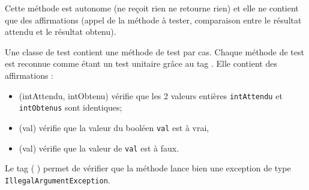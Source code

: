 \documentclass[11pt,a4paper]{article}
\begin{document}
            \par
            
								Cette m\'ethode est autonome (ne re\c coit rien ne retourne rien) 
								et elle ne contient que des affirmations 
								(appel de la m\'ethode \`a tester, comparaison entre le r\'esultat attendu et le r\'esultat obtenu).
							
            \par
            
								Une classe de test contient une m\'ethode de test par cas.
								Chaque m\'ethode de test est reconnue comme \'etant un test unitaire gr\^ace au tag  \textcolor{gray}{\underline{\hspace*{3em}}}  .
								Elle contient des affirmations :
							
            \par
        
					\begin{itemize}
				
			\item  \textcolor{gray}{\underline{\hspace*{10em}}} (intAttendu, intObtenu) 
								  v\'erifie que les 2 valeurs enti\`eres \verb|intAttendu| et \verb|intObtenus| sont identiques;
								
            \par
        
			\item  \textcolor{gray}{\underline{\hspace*{10em}}} (val) 
								  v\'erifie que la valeur du bool\'een \verb|val| est \`a vrai,     
                
            \par
        
			\item  \textcolor{gray}{\underline{\hspace*{10em}}} (val) 
								  v\'erifie que la valeur de \verb|val| est \`a faux.    
                
            \par
        
					\end{itemize}
				    
								Le tag  \textcolor{gray}{\underline{\hspace*{3em}}}  ( \textcolor{gray}{\underline{\hspace*{20em}}} )  
                permet de v\'erifier que la m\'ethode lance bien une exception de type \verb|IllegalArgumentException|.    
							
\end{document}
